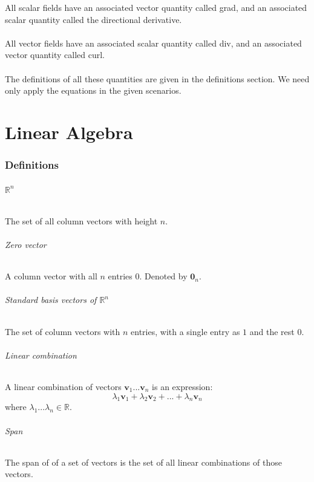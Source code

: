 \documentclass{scrartcl}
\newcommand{\R}{\mathbb{R}}
\renewcommand{\vec}[1]{\mathbf{#1}}
\begin{document}
All scalar fields have an associated vector quantity called grad, and an associated scalar quantity called the directional derivative.
\\\\
All vector fields have an associated scalar quantity called div, and an associated vector quantity called curl.
\\\\
The definitions of all these quantities are given in the definitions section. We need only apply the equations in the given scenarios.

\newpage
\part{Linear Algebra}

\section{Definitions}

\paragraph{$ \R^{n} $}
The set of all column vectors with height $ n $.

\paragraph{Zero vector}
A column vector with all $ n $ entries $ 0 $. Denoted by $ \vec{0}_{n} $.

\paragraph{Standard basis vectors of $ \R^{n} $}
The set of column vectors with $ n $ entries, with a single entry as $ 1 $ and the rest $ 0 $.

\paragraph{Linear combination}
A linear combination of vectors $ \vec{v}_{1}...\vec{v}_{n} $ is an expression:
\begin{equation}
\lambda_{1} \vec{v}_{1} + \lambda_{2} \vec{v}_{2} + ... + \lambda_{n} \vec{v}_{n}
\end{equation}
where $ \lambda_{1}...\lambda_{n} \in \R $.

\paragraph{Span}
The span of of a set of vectors is the set of all linear combinations of those vectors.
\end{document}
